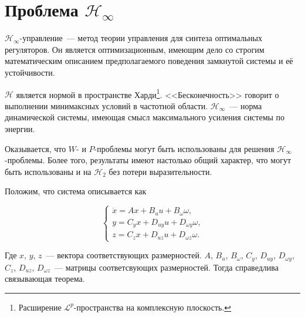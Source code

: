 


\section{Проблема $\mathcal{H}_\infty$}

$\mathcal{H}_\infty$-управление~--- метод теории управления для синтеза оптимальных регуляторов. Он является оптимизационным, имеющим дело со строгим математическим описанием предполагаемого поведения замкнутой системы и её устойчивости.

$\mathcal{H}$ является нормой в пространстве Харди\footnote{Расширение $\mathcal{L}^p$-пространства на комплексную плоскость.}. <<Бесконечность>> говорит о выполнении минимаксных условий в частотной области. $\mathcal{H}_\infty$~--- норма динамической системы, имеющая смысл максимального усиления системы по энергии.\br

Оказывается, что $W$- и $P$-проблемы могут быть использованы для решения $\mathcal{H}_\infty$-проблемы. Более того, результаты имеют настолько общий характер, что могут быть использованы и на $\mathcal{H}_2$ без потери выразительности.

Положим, что система описывается как

\begin{equation}
\label{eq:2/4}
\left\{ \begin{array}{l}
         \dot{x} = Ax + B_uu + B_\omega\omega\mbox{,} \\
         y = C_yx + D_{uy}u + D_{\omega y}\omega\mbox{,} \\
         z = C_zx + D_{uz}u + D_{\omega z}\omega\mbox{.}
        \end{array}
\right.
\end{equation}

\begin{flushleft}
Где $x$, $y$, $z$~--- вектора соответствующих размерностей. $A$, $B_u$, $B_\omega$, $C_y$, $D_{uy}$, $D_{\omega y}$, $C_z$, $D_{uz}$, $D_{\omega z}$~--- матрицы соответсвующих размерностей. Тогда справедлива связывающая теорема.
\end{flushleft}

